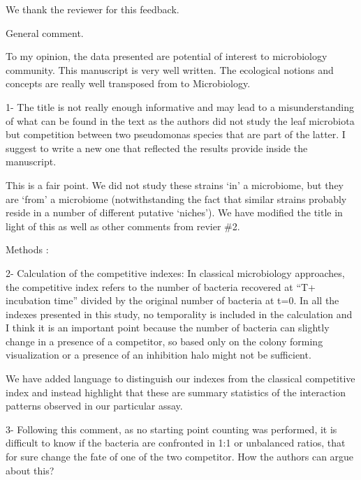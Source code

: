 \documentclass[11pt,]{article}
\begin{document}
We thank the reviewer for this feedback.

\begin{blockquote}
General comment.
\end{blockquote}

\begin{blockquote}
To my opinion, the data presented are potential of interest to
microbiology community. This manuscript is very well written. The
ecological notions and concepts are really well transposed from to
Microbiology.
\end{blockquote}

\begin{blockquote}
1- The title is not really enough informative and may lead to a
misunderstanding of what can be found in the text as the authors did not
study the leaf microbiota but competition between two pseudomonas
species that are part of the latter. I suggest to write a new one that
reflected the results provide inside the manuscript.
\end{blockquote}

This is a fair point. We did not study these strains `in' a microbiome,
but they are `from' a microbiome (notwithstanding the fact that similar
strains probably reside in a number of different putative `niches'). We
have modified the title in light of this as well as other comments from
revier \#2.

\begin{blockquote}
Methods :
\end{blockquote}

\begin{blockquote}
2- Calculation of the competitive indexes: In classical microbiology
approaches, the competitive index refers to the number of bacteria
recovered at ``T+ incubation time'' divided by the original number of
bacteria at t=0. In all the indexes presented in this study, no
temporality is included in the calculation and I think it is an
important point because the number of bacteria can slightly change in a
presence of a competitor, so based only on the colony forming
visualization or a presence of an inhibition halo might not be
sufficient.
\end{blockquote}

We have added language to distinguish our indexes from the classical
competitive index and instead highlight that these are summary
statistics of the interaction patterns observed in our particular assay.

\begin{blockquote}
3- Following this comment, as no starting point counting was performed,
it is difficult to know if the bacteria are confronted in 1:1 or
unbalanced ratios, that for sure change the fate of one of the two
competitor. How the authors can argue about this?
\end{blockquote}
\end{document}
